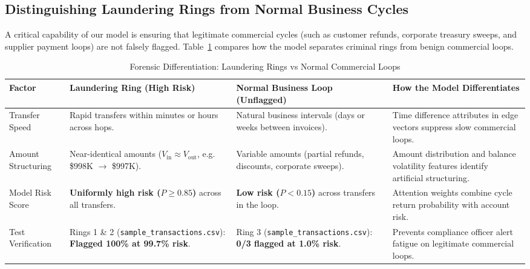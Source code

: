\documentclass[11pt, a4paper]{article}
\begin{document}
\subsection{Distinguishing Laundering Rings from Normal Business Cycles}
\noindent
A critical capability of our model is ensuring that legitimate commercial cycles (such as customer refunds, corporate treasury sweeps, and supplier payment loops) are not falsely flagged. Table~\ref{tab:benign_vs_fraud} compares how the model separates criminal rings from benign commercial loops.

\begin{table}[H]
    \centering
    \footnotesize
    \renewcommand{\arraystretch}{1.18}
    \begin{tabular}{|p{2.6cm}|p{3.8cm}|p{3.8cm}|p{4.2cm}|}
        \hline
        \textbf{Factor} & \textbf{Laundering Ring (High Risk)} & \textbf{Normal Business Loop (Unflagged)} & \textbf{How the Model Differentiates} \\
        \hline
        Transfer Speed & Rapid transfers within minutes or hours across hops. & Natural business intervals (days or weeks between invoices). & Time difference attributes in edge vectors suppress slow commercial loops. \\
        \hline
        Amount Structuring & Near-identical amounts ($V_{\text{in}} \approx V_{\text{out}}$, e.g. \$998K $\to$ \$997K). & Variable amounts (partial refunds, discounts, corporate sweeps). & Amount distribution and balance volatility features identify artificial structuring. \\
        \hline
        Model Risk Score & \textbf{Uniformly high risk ($P \ge 0.85$)} across all transfers. & \textbf{Low risk ($P < 0.15$)} across transfers in the loop. & Attention weights combine cycle return probability with account risk. \\
        \hline
        Test Verification & Rings 1 \& 2 (\texttt{sample\_transactions.csv}): \textbf{Flagged 100\% at 99.7\% risk}. & Ring 3 (\texttt{sample\_transactions.csv}): \textbf{0/3 flagged at 1.0\% risk}. & Prevents compliance officer alert fatigue on legitimate commercial loops. \\
        \hline
    \end{tabular}
    \caption{Forensic Differentiation: Laundering Rings vs Normal Commercial Loops}
    \label{tab:benign_vs_fraud}
\end{table}
\end{document}
